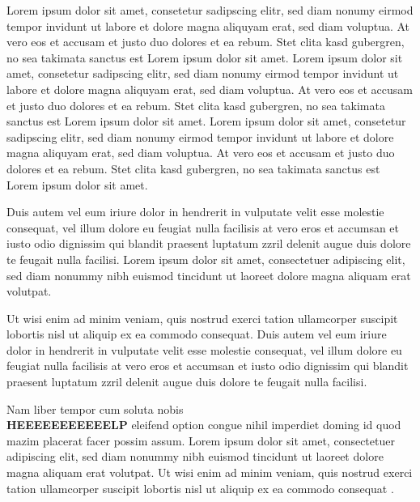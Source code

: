 \documentclass[a4paper,10pt]{article}
\begin{document}
Lorem ipsum \cite{borges2006} dolor sit amet, consetetur sadipscing elitr, sed diam nonumy eirmod tempor invidunt ut labore et dolore magna aliquyam erat, sed diam voluptua. At vero eos et accusam et justo duo dolores et ea rebum. Stet clita kasd gubergren, no sea takimata sanctus est Lorem ipsum dolor sit amet. Lorem ipsum dolor sit amet, consetetur sadipscing elitr, sed diam nonumy eirmod tempor invidunt ut labore et dolore magna aliquyam erat, sed diam voluptua. At vero eos et accusam et justo duo dolores et ea rebum. Stet clita kasd gubergren, no sea takimata sanctus est Lorem ipsum dolor sit amet. Lorem ipsum dolor sit amet, consetetur sadipscing elitr, sed diam nonumy eirmod tempor invidunt ut labore et dolore magna aliquyam erat, sed diam voluptua. At vero eos et accusam et justo duo dolores et ea rebum. Stet clita kasd gubergren, no sea takimata sanctus est Lorem ipsum dolor sit amet.   

Duis autem vel eum iriure dolor in hendrerit in vulputate velit esse molestie consequat, vel illum dolore eu feugiat nulla facilisis at vero eros et accumsan et iusto odio dignissim qui blandit praesent luptatum zzril delenit augue duis dolore te feugait nulla facilisi. Lorem ipsum dolor sit amet, consectetuer adipiscing elit, sed diam nonummy nibh euismod tincidunt ut laoreet dolore magna aliquam erat volutpat.   

Ut wisi enim ad minim veniam, quis nostrud exerci tation ullamcorper suscipit lobortis nisl ut aliquip ex ea commodo consequat. Duis autem vel eum iriure dolor in hendrerit in vulputate velit esse molestie consequat, vel illum dolore eu feugiat nulla facilisis at vero eros et accumsan et iusto odio dignissim qui blandit praesent luptatum zzril delenit augue duis dolore te feugait nulla facilisi.   

Nam liber tempor cum soluta nobis \\
\textbf{HEEEEEEEEEEELP} eleifend option congue nihil imperdiet doming id quod mazim placerat facer possim assum. Lorem ipsum dolor sit amet, consectetuer adipiscing elit, sed diam nonummy nibh euismod tincidunt ut laoreet dolore magna aliquam erat volutpat. Ut wisi enim ad minim veniam, quis nostrud exerci tation ullamcorper suscipit lobortis nisl ut aliquip ex ea commodo consequat \cite{lobes2018,borges2006} \cite{lobes2018}\cite{borges2006}.   

  
  
\end{document}
